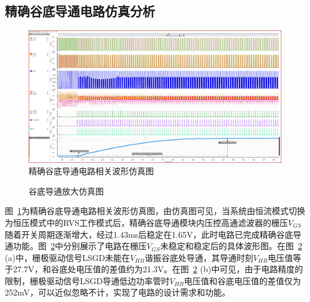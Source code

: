 \subsection{精确谷底导通电路仿真分析}

\begin{figure}[htbp] 
    \centering
    \includegraphics[width=0.8\linewidth]{figures/valley_switch.png}
    \caption{精确谷底导通电路相关波形仿真图}
    \label{fig:谷底导通仿真图}
\end{figure} 


\begin{figure}[htbp]
	\centering
	\caption{谷底导通放大仿真图}
	\label{fig:谷底导通放大仿真图}
\end{figure}

图~\ref{fig:谷底导通仿真图}为精确谷底导通电路相关波形仿真图，由仿真图可见，当系统由恒流模式切换为恒压模式中的RVS工作模式后，精确谷底导通模块内压控高通滤波器的栅压$V_{GS}$随着开关周期逐渐增大，经过1.43ms后稳定在1.65V，此时电路已完成精确谷底导通功能。图~\ref{fig:谷底导通放大仿真图}中分别展示了电路在栅压$V_{GS}$未稳定和稳定后的具体波形图。在图~\ref{fig:谷底导通放大仿真图} (a)中，栅极驱动信号LSGD未能在$V_{HB}$谐振谷底处导通，其导通时刻$V_{HB}$电压值等于27.7V，和谷底处电压值的差值约为21.3V。在图~\ref{fig:谷底导通放大仿真图} (b)中可见，由于电路精度的限制，栅极驱动信号LSGD导通低边功率管时$V_{HB}$电压值和谷底电压值的差值仅为252mV，可以近似忽略不计，实现了电路的设计需求和功能。

